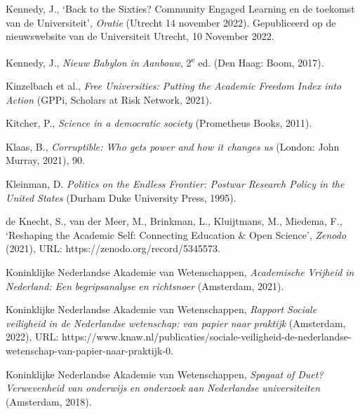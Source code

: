 \documentclass[smallauthor, chapterhaspagenum, nochapterinheader, pagenuminheader,  bigchapnum,medium2, tocpages, garamond, titleinheader]{jote-book}
\begin{document}
\begin{references}
		Kennedy, J., ‘Back to the Sixties? Community Engaged Learning en de toekomst van de Universiteit', \emph{Oratie} (Utrecht 14 november 2022). Gepubliceerd op de nieuwswebsite van de Universiteit Utrecht, 10 November 2022.



		Kennedy, J., \emph{Nieuw}\emph{ Babylon in }\emph{Aanbouw}, 2\textsuperscript{e} ed. (Den Haag: Boom, 2017).



		Kinzelbach et al., \emph{Free Universities: Putting the Academic Freedom Index into Action} (GPPi, Scholars at Risk Network, 2021).



		Kitcher, P., \emph{Science in a democratic society} (Prometheus Books, 2011).



		Klaas, B., \emph{Corruptible: Who gets power and how it changes us} (London: John Murray, 2021), 90.



		Kleinman, D. \emph{Politics on the Endless Frontier: Postwar Research Policy in the United States} (Durham Duke University Press, 1995).



		de Knecht, S., van der Meer, M., Brinkman, L., Kluijtmans, M., Miedema, F., ‘Reshaping the Academic Self: Connecting Education \& Open Science', \emph{Zenodo} (2021), URL: https://zenodo.org/record/5345573.



		Koninklijke Nederlandse Akademie van Wetenschappen, \emph{Academische}\emph{ }\emph{Vrijheid}\emph{ in Nederland: }\emph{Een}\emph{ }\emph{begripsanalyse}\emph{ }\emph{en}\emph{ }\emph{richtsnoer} (Amsterdam, 2021).



		Koninklijke Nederlandse Akademie van Wetenschappen, \emph{Rapport }\emph{Sociale}\emph{ }\emph{veiligheid}\emph{ in de }\emph{Nederlandse}\emph{ }\emph{wetenschap}\emph{: }\emph{v}\emph{an papier }\emph{naar}\emph{ }\emph{praktijk} (Amsterdam, 2022), URL: https://www.knaw.nl/publicaties/sociale-veiligheid-de-nederlandse-wetenschap-van-papier-naar-praktijk-0.



		Koninklijke Nederlandse Akademie van Wetenschappen, \emph{Spagaat}\emph{ of Duet? }\emph{Verwevenheid}\emph{ van }\emph{onderwijs}\emph{ }\emph{en}\emph{ }\emph{onderzoek}\emph{ }\emph{aan}\emph{ }\emph{Nederlandse}\emph{ }\emph{universiteiten}\emph{ }(Amsterdam, 2018).




\end{references}
\end{document}
